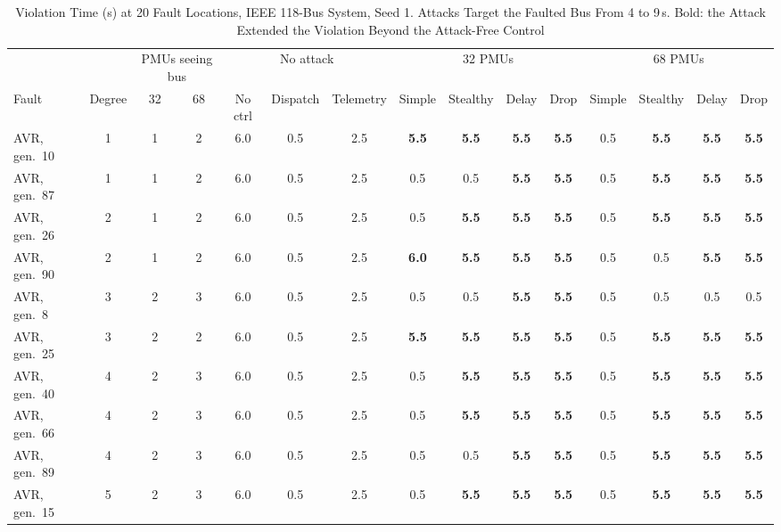 \begin{table}[t]
\caption{Violation Time (s) at 20 Fault Locations, IEEE 118-Bus System, Seed 1. Attacks Target the Faulted Bus From 4 to 9\,s. Bold: the Attack Extended the Violation Beyond the Attack-Free Control}
\label{tab:locations}
\centering
\footnotesize
\setlength{\tabcolsep}{3.4pt}
\begin{tabular}{@{}lcccccccccccccc@{}}
\toprule
 & & \multicolumn{2}{c}{PMUs seeing bus} & \multicolumn{3}{c}{No attack} & \multicolumn{4}{c}{32 PMUs} & \multicolumn{4}{c}{68 PMUs} \\
\cmidrule(lr){3-4}\cmidrule(lr){5-7}\cmidrule(lr){8-11}\cmidrule(l){12-15}
Fault & Degree & 32 & 68 & No ctrl & Dispatch & Telemetry & Simple & Stealthy & Delay & Drop & Simple & Stealthy & Delay & Drop \\
\midrule
AVR, gen.\ 10 & 1 & 1 & 2 & 6.0 & 0.5 & 2.5 & \textbf{5.5} & \textbf{5.5} & \textbf{5.5} & \textbf{5.5} & 0.5 & \textbf{5.5} & \textbf{5.5} & \textbf{5.5} \\
AVR, gen.\ 87 & 1 & 1 & 2 & 6.0 & 0.5 & 2.5 & 0.5 & 0.5 & \textbf{5.5} & \textbf{5.5} & 0.5 & \textbf{5.5} & \textbf{5.5} & \textbf{5.5} \\
AVR, gen.\ 26 & 2 & 1 & 2 & 6.0 & 0.5 & 2.5 & 0.5 & \textbf{5.5} & \textbf{5.5} & \textbf{5.5} & 0.5 & \textbf{5.5} & \textbf{5.5} & \textbf{5.5} \\
AVR, gen.\ 90 & 2 & 1 & 2 & 6.0 & 0.5 & 2.5 & \textbf{6.0} & \textbf{5.5} & \textbf{5.5} & \textbf{5.5} & 0.5 & 0.5 & \textbf{5.5} & \textbf{5.5} \\
AVR, gen.\ 8 & 3 & 2 & 3 & 6.0 & 0.5 & 2.5 & 0.5 & 0.5 & \textbf{5.5} & \textbf{5.5} & 0.5 & 0.5 & 0.5 & 0.5 \\
AVR, gen.\ 25 & 3 & 2 & 2 & 6.0 & 0.5 & 2.5 & \textbf{5.5} & \textbf{5.5} & \textbf{5.5} & \textbf{5.5} & 0.5 & \textbf{5.5} & \textbf{5.5} & \textbf{5.5} \\
AVR, gen.\ 40 & 4 & 2 & 3 & 6.0 & 0.5 & 2.5 & 0.5 & \textbf{5.5} & \textbf{5.5} & \textbf{5.5} & 0.5 & \textbf{5.5} & \textbf{5.5} & \textbf{5.5} \\
AVR, gen.\ 66 & 4 & 2 & 3 & 6.0 & 0.5 & 2.5 & 0.5 & \textbf{5.5} & \textbf{5.5} & \textbf{5.5} & 0.5 & \textbf{5.5} & \textbf{5.5} & \textbf{5.5} \\
AVR, gen.\ 89 & 4 & 2 & 3 & 6.0 & 0.5 & 2.5 & 0.5 & 0.5 & \textbf{5.5} & \textbf{5.5} & 0.5 & \textbf{5.5} & \textbf{5.5} & \textbf{5.5} \\
AVR, gen.\ 15 & 5 & 2 & 3 & 6.0 & 0.5 & 2.5 & 0.5 & \textbf{5.5} & \textbf{5.5} & \textbf{5.5} & 0.5 & \textbf{5.5} & \textbf{5.5} & \textbf{5.5} \\

\end{tabular}
\end{table}
